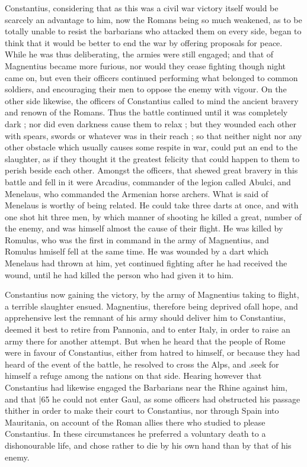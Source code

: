 Constantius, considering that as this was a civil war victory itself would be scarcely an advantage to him, now the Romans being so much weakened, as to be totally unable to resist the barbarians who attacked them on every side, began to think that it would be better to end the war by offering proposals for peace. While he was thus deliberating, the armies were still engaged; and that of Magnentius became more furious, nor would they cease fighting though night came on, but even their officers continued performing what belonged to common soldiers, and encouraging their men to oppose the enemy with vigour. On the other side likewise, the officers of Constantius called to mind the ancient bravery and renown of the Romans. Thus the battle continued until it was completely dark ; nor did even darkness cause them to relax ; but they wounded each other with spears, swords or whatever was in their reach ; so that neither night nor any other obstacle which usually causes some respite in war, could put an
end to the slaughter, as if they thought it the greatest felicity that could happen to them to perish beside each other. Amongst the officers, that shewed great bravery in this battle and fell in it were Arcadius, commander of the legion called Abulci, and Menelaus, who commanded the Armenian horse archers. What is said of Menelaus is worthy of being related. He could take three darts at once, and with one shot hit three men, by which manner of shooting he killed a great, number of the enemy, and was himself almost the cause of their flight. He was killed by Romulus,
who was the first in command in the army of Magnentius, and Romulus hmiself fell at the same time. He was wounded by a dart which Menelaus had thrown at him, yet continued fighting after he had received the wound, until he had killed the person who had given it to him.

Constantius now gaining the victory, by the army of Magnentius taking to flight, a terrible slaughter ensued. Magnentius, therefore being deprived ofall hope, and apprehensive lest the remnant of his army should deliver him to Constantius, deemed it best to retire from Pannonia, and to enter Italy, in order to raise an army there for another attempt. But when he heard that the people of Rome were in favour of Constantius, either from hatred to himself, or because they had heard of the event of the battle, he resolved to cross the Alps, and .seek for himself a refuge among the nations on that side. Hearing however that Constantius had likewise engaged the Barbarians near the Rhine against him, and that
|65 he could not enter Gaul, as some officers had obstructed his passage thither in order to make their court to Constantius, nor through Spain into Mauritania, on account of the Roman allies there who studied to please Constantius. In these circumstances he preferred a voluntary death to a dishonourable life, and chose rather to die by his own hand than by that of his enemy.

